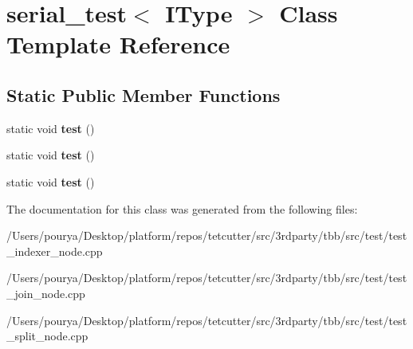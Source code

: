 \hypertarget{classserial__test}{}\section{serial\+\_\+test$<$ I\+Type $>$ Class Template Reference}
\label{classserial__test}
\subsection*{Static Public Member Functions}
\begin{DoxyCompactItemize}
\item 
\hypertarget{classserial__test_ac09331d4f791aa69941b245f2fc7be3d}{}static void {\bfseries test} ()\label{classserial__test_ac09331d4f791aa69941b245f2fc7be3d}

\item 
\hypertarget{classserial__test_ac09331d4f791aa69941b245f2fc7be3d}{}static void {\bfseries test} ()\label{classserial__test_ac09331d4f791aa69941b245f2fc7be3d}

\item 
\hypertarget{classserial__test_ac09331d4f791aa69941b245f2fc7be3d}{}static void {\bfseries test} ()\label{classserial__test_ac09331d4f791aa69941b245f2fc7be3d}

\end{DoxyCompactItemize}


The documentation for this class was generated from the following files\+:\begin{DoxyCompactItemize}
\item 
/\+Users/pourya/\+Desktop/platform/repos/tetcutter/src/3rdparty/tbb/src/test/test\+\_\+indexer\+\_\+node.\+cpp\item 
/\+Users/pourya/\+Desktop/platform/repos/tetcutter/src/3rdparty/tbb/src/test/test\+\_\+join\+\_\+node.\+cpp\item 
/\+Users/pourya/\+Desktop/platform/repos/tetcutter/src/3rdparty/tbb/src/test/test\+\_\+split\+\_\+node.\+cpp\end{DoxyCompactItemize}

